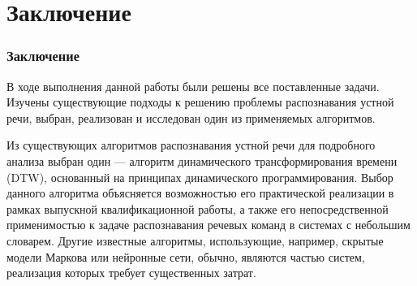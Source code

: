 \documentclass[slidestop, compress, mathserif, blackandwhite, utf8, serif, slidescentered]{beamer}
\begin{document}
\section{Заключение}
\begin{frame}
	\frametitle{Заключение}
	В ходе выполнения данной работы были решены все поставленные задачи. Изучены существующие подходы к решению проблемы распознавания устной речи, выбран, реализован и исследован один из применяемых алгоритмов.

	Из существующих алгоритмов распознавания устной речи для подробного анализа выбран один --- алгоритм динамического трансформирования времени (DTW), основанный на принципах динамического программирования. Выбор данного алгоритма объясняется возможностью его практической реализации в рамках выпускной квалификационной работы, а также его непосредственной применимостью к задаче распознавания речевых команд в системах с небольшим словарем. Другие известные алгоритмы,  использующие, например, скрытые модели Маркова или нейронные сети, обычно, являются частью систем, реализация которых требует существенных затрат.
	
\end{frame}
\end{document}

